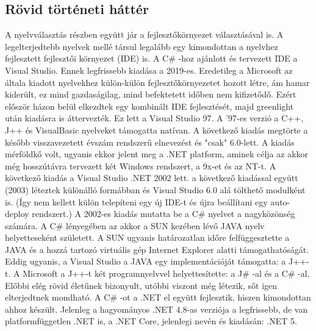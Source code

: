 \subsection{Rövid történeti háttér}
A nyelvválasztás részben együtt jár a fejlesztőkörnyezet választásával is. A legelterjedtebb nyelvek mellé társul legalább egy kimondottan a nyelvhez fejlesztett fejlesztői környezet (IDE) is. A C\# -hoz ajánlott és tervezett  IDE a Visual Studio. Ennek legfrissebb kiadása a 2019-es. Eredetileg a Microsoft az általa kiadott nyelvekhez külön-külön fejlesztőkörnyezetet hozott létre, ám hamar kiderült, ez mind gazdaságilag, mind befektetett időben nem kifizetődő. Ezért először házon belül elkezdtek egy kombinált IDE fejlesztését, majd greenlight után kiadásra is áttervezték. Ez lett a Visual Studio 97. A '97-es verzió a C++, J++ és VisualBasic nyelveket támogatta natívan. A következő kiadás megtörte a később visszavezetett évszám rendszerű elnevezést és "csak" 6.0-lett. A kiadás mérföldkő volt, ugyanis ekkor jelent meg a .NET platform, aminek célja az akkor még hosszútávra tervezett két Windows rendszert, a 9x-et és az NT-t. A következő kiadás a Visual Studio .NET 2002 lett. a következő kiadással együtt (2003) léteztek különálló formábban és Visual Studio 6.0 alá tölthető modulként is. (Így nem kellett külön telepíteni egy új IDE-t és újra beállítani egy auto-deploy rendszert.) A 2002-es kiadás mutatta be a C\# nyelvet a nagyközönség számára. A C\# lényegében az akkor a SUN kezében lévő JAVA nyelv helyetteseként született. A SUN ugyanis határozatlan időre felfüggesztette a JAVA és a hozzá tartozó virtuális gép Internet Explorer alatti támogathatóságát. Eddig ugyanis, a Visual Studio a JAVA egy implementációját támogatta: a J++-t. A Microsoft a J++-t két programnyelvvel helyettesítette: a J\# -al és a C\# -al. Előbbi elég rövid életűnek bizonyult, utóbbi viszont még létezik, sőt igen elterjedtnek mondható. A C\# -ot a .NET el együtt fejlesztik, hiszen kimondottan ahhoz készült. 
Jelenleg a hagyományos .NET 4.8-as verziója a legfrissebb, de van platformfüggetlen .NET is, a .NET Core, jelenlegi nevén és kiadásán: .NET 5.

